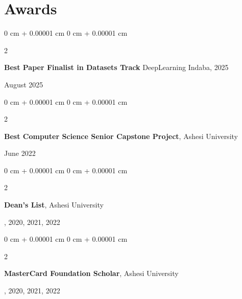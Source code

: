 \documentclass[10pt, letterpaper]{article}
\newenvironment{highlights}{
    \begin{itemize}[
        topsep=0.10 cm,
        parsep=0.10 cm,
        partopsep=0pt,
        itemsep=0pt,
        leftmargin=0 cm + 10pt
    ]
}{
    \end{itemize}
} %
\newenvironment{onecolentry}{
    \begin{adjustwidth}{
        0 cm + 0.00001 cm
    }{
        0 cm + 0.00001 cm
    }
}{
    \end{adjustwidth}
} %
\newenvironment{twocolentry}[2][]{
    \onecolentry
    \def\secondColumn{#2}
    \setcolumnwidth{\fill, 4.5 cm}
    \begin{paracol}{2}
}{
    \switchcolumn \raggedleft \secondColumn
    \end{paracol}
    \endonecolentry
} %
\begin{document}





    \section{Awards}
        \normalsize
        \begin{twocolentry}
            {August 2025}
                \textbf{Best Paper Finalist in Datasets Track} DeepLearning Indaba, 2025
        \end{twocolentry}
        \vspace{0.10 cm}

        \begin{twocolentry}
            {June 2022}
                \textbf{Best Computer Science Senior Capstone Project}, Ashesi University
        \end{twocolentry}
        \vspace{0.10 cm}

        \begin{twocolentry}
            {2019, 2020, 2021, 2022}
                \textbf{Dean’s List}, Ashesi University
        \end{twocolentry}
        \vspace{0.10 cm}

        \begin{twocolentry}
            {2019, 2020, 2021, 2022}
                \textbf{MasterCard Foundation Scholar}, Ashesi University
        \end{twocolentry}
        \vspace{0.10 cm}
\end{document}
